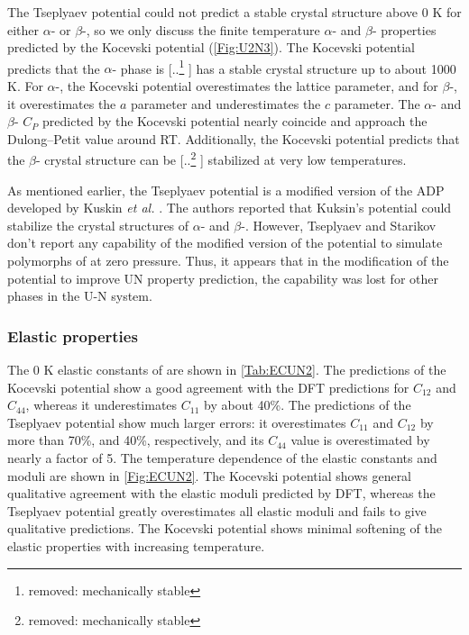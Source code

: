 \documentclass[preprint, 12pt]{elsarticle}
\providecommand{\DIFaddtex}[1]{{\protect\color{blue} \sf #1}} %
\providecommand{\DIFdeltex}[1]{{\protect\color{red} [..\footnote{removed: #1} ]}} %
\providecommand{\DIFaddbegin}{} %
\providecommand{\DIFaddend}{} %
\providecommand{\DIFdelbegin}{} %
\providecommand{\DIFdelend}{} %
\providecommand{\DIFadd}[1]{\texorpdfstring{\DIFaddtex{#1}}{#1}} %
\providecommand{\DIFdel}[1]{\texorpdfstring{\DIFdeltex{#1}}{}} %
\newcommand{\DIFscaledelfig}{0.5}
\newlength{\DIFdelgraphicswidth} %
\newlength{\DIFdelgraphicsheight} %
\newcommand{\DIFaddincludegraphics}[2][]{{\color{blue}\fbox{\DIFOincludegraphics[#1]{#2}}}} %
\newcommand{\DIFdelincludegraphics}[2][]{%
\sbox{\DIFdelgraphicsbox}{\DIFOincludegraphics[#1]{#2}}%
\settoboxwidth{\DIFdelgraphicswidth}{\DIFdelgraphicsbox} %
\settoboxtotalheight{\DIFdelgraphicsheight}{\DIFdelgraphicsbox} %
\scalebox{\DIFscaledelfig}{%
\parbox[b]{\DIFdelgraphicswidth}{\usebox{\DIFdelgraphicsbox}\\[-\baselineskip] \rule{\DIFdelgraphicswidth}{0em}}\llap{\resizebox{\DIFdelgraphicswidth}{\DIFdelgraphicsheight}{%
\setlength{\unitlength}{\DIFdelgraphicswidth}%
\begin{picture}(1,1)%
\thicklines\linethickness{2pt} %
{\color[rgb]{1,0,0}\put(0,0){\framebox(1,1){}}}%
{\color[rgb]{1,0,0}\put(0,0){\line( 1,1){1}}}%
{\color[rgb]{1,0,0}\put(0,1){\line(1,-1){1}}}%
\end{picture}%
}\hspace*{3pt}}} %
} %
\DeclareRobustCommand{\DIFaddbegin}{\DIFOaddbegin \let\includegraphics\DIFaddincludegraphics} %
\DeclareRobustCommand{\DIFaddend}{\DIFOaddend \let\includegraphics\DIFOincludegraphics} %
\DeclareRobustCommand{\DIFdelbegin}{\DIFOdelbegin \let\includegraphics\DIFdelincludegraphics} %
\DeclareRobustCommand{\DIFdelend}{\DIFOaddend \let\includegraphics\DIFOincludegraphics} %
\begin{document}
The Tseplyaev potential could not predict a stable \DIFaddbegin \DIFadd{crystal }\DIFaddend structure above 0 K for either $\alpha$- or $\beta$-, so we only discuss the finite temperature $\alpha$- and $\beta$- properties predicted by the Kocevski potential (\cref{Fig:U2N3}). The Kocevski potential predicts that the $\alpha$- phase is \DIFdelbegin \DIFdel{mechanically stable }\DIFdelend \DIFaddbegin \DIFadd{has a stable crystal structure }\DIFaddend up to about 1000 K. For $\alpha$-, the Kocevski potential overestimates the lattice parameter, and for $\beta$-, it overestimates the $a$ parameter and underestimates the $c$ parameter. The $\alpha$- and $\beta$- $C_P$ predicted by the Kocevski potential nearly coincide and approach the Dulong–Petit value around RT. Additionally, the Kocevski potential predicts that the $\beta$- \DIFaddbegin \DIFadd{crystal }\DIFaddend structure can be \DIFdelbegin \DIFdel{mechanically stable }\DIFdelend \DIFaddbegin \DIFadd{stabilized }\DIFaddend at very low temperatures.

As mentioned earlier, the Tseplyaev potential is a modified version of the ADP developed by Kuskin \textit{et al.} \cite{Kuksin2016}. The authors reported that Kuksin's potential could stabilize the \DIFaddbegin \DIFadd{crystal }\DIFaddend structures of $\alpha$- and $\beta$-. However, Tseplyaev and Starikov \cite{Tseplyaev2016} don't report any capability of the modified version of the potential to simulate polymorphs of  at zero pressure. Thus, it appears that in the modification of the potential to improve UN property prediction, the capability was lost for other phases in the U-N system.



\subsubsection{Elastic properties}

The 0 K elastic constants of  are shown in \cref{Tab:ECUN2}. The predictions of the Kocevski potential show a good agreement with the DFT predictions for $C_{12}$ and $C_{44}$, whereas it underestimates $C_{11}$ by about 40\%. The predictions of the Tseplyaev potential show much larger errors: it overestimates $C_{11}$ and $C_{12}$ by more than 70\%, and 40\%, respectively, and its $C_{44}$ value is overestimated by nearly a factor of 5. The temperature dependence of the  elastic constants and moduli are shown in \cref{Fig:ECUN2}. The Kocevski potential shows general qualitative agreement with the  elastic moduli predicted by DFT, whereas the Tseplyaev potential greatly overestimates all elastic moduli and fails to give qualitative predictions. The Kocevski potential shows minimal softening of the  elastic properties with increasing temperature.
\end{document}
